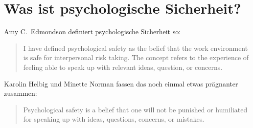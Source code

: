 \section{Was ist psychologische Sicherheit?}
\label{ps-definition}

Amy C.~Edmondson \cite{the-fearless-organisation} definiert psychologische Sicherheit so:

\begin{quote}
  I have defined psychological safety as the belief that the work environment is safe for interpersonal risk taking. The concept refers to the experience of feeling able to speak up with relevant ideas, question, or concerns.
\end{quote}

Karolin Helbig und Minette Norman \cite{psychological-safety-playbook} fassen das noch einmal etwas prägnanter zusammen:

\begin{quote}
  Psychological safety is a belief that one will not be punished or humiliated for speaking up with ideas, questions, concerns, or mistakes.
\end{quote}
